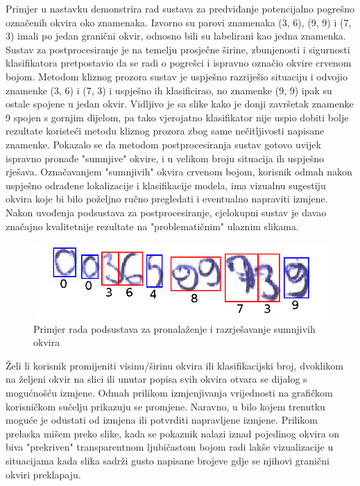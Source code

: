 \documentclass[times, utf8, diplomski]{fer}
\theoremstyle{definition}
\begin{document}
Primjer u nastavku demonstrira rad sustava za predviđanje potencijalno pogrešno označenih okvira oko znamenaka. Izvorno su parovi znamenaka (3, 6), (9, 9) i (7, 3) imali po jedan granični okvir, odnosno bili su labelirani kao jedna znamenka. Sustav za postprocesiranje je na temelju prosječne širine, zbunjenosti i sigurnosti klasifikatora pretpostavio da se radi o pogrešci i ispravno označio okvire crvenom bojom. Metodom kliznog prozora sustav je uspješno razriješio situaciju i odvojio znamenke (3, 6) i (7, 3) i uspješno ih klasificirao, no znamenke (9, 9) ipak su ostale spojene u jedan okvir. Vidljivo je sa slike kako je donji završetak znamenke 9 spojen s gornjim dijelom, pa tako vjerojatno klasifikator nije uspio dobiti bolje rezultate koristeći metodu kliznog prozora zbog same nečitljivosti napisane znamenke. Pokazalo se da metodom postprocesiranja sustav gotovo uvijek ispravno pronađe "sumnjive" okvire, i u velikom broju situacija ih uspješno rješava. Označavanjem "sumnjivih" okvira crvenom bojom, korisnik odmah nakon uspješno odrađene lokalizacije i klasifikacije modela, ima vizualnu sugestiju okvira koje bi bilo poželjno ručno pregledati i eventualno napraviti izmjene. Nakon uvođenja podsustava za postprocesiranje, cjelokupni sustav je davao značajno kvalitetnije rezultate na "problematičnim" ulaznim slikama.
\begin{figure}[h]
	\centering
	\includegraphics[scale=0.46]{postprocesor.png}
	\caption{Primjer rada podsustava za pronalaženje i razrješavanje sumnjivih okvira}
\end{figure}
\newline
Želi li korisnik promijeniti visinu/širinu okvira ili klasifikacijski broj, dvoklikom na željeni okvir na slici ili unutar popisa svih okvira otvara se dijalog s mogućnošću izmjene. Odmah prilikom izmjenjivanja vrijednosti na grafičkom korisničkom sučelju prikazuju se promjene. Naravno, u bilo kojem trenutku moguće je odustati od izmjena ili potvrditi napravljene izmjene. Prilikom prelaska mišem preko slike, kada se pokaznik nalazi iznad pojedinog okvira on biva "prekriven" transparentnom ljubičastom bojom radi lakše vizualizacije u situacijama kada slika sadrži gusto napisane brojeve gdje se njihovi granični okviri preklapaju.
\end{document}
